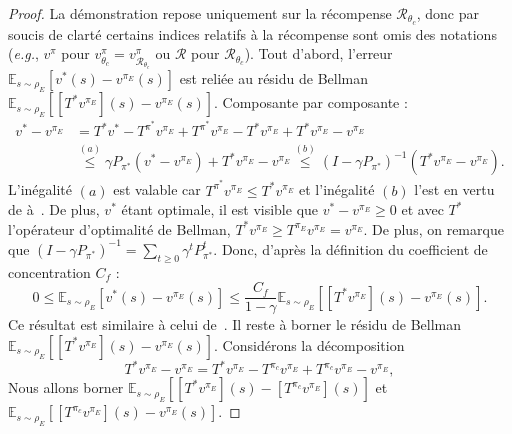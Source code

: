 \documentclass[english,utf8]{./hermes-journal}
\newcommand{\R}{\mathcal{R}}
\newcommand{\E}{\mathbb{E}}
\begin{document}
\begin{proof}
  La démonstration repose uniquement sur la récompense $\R_{\theta_c}$, donc par soucis de clarté certains indices relatifs à la récompense sont omis des notations  
  (\textit{e.g.}, $v^\pi$ pour
  $v^\pi_{\theta_c}=v^\pi_{\R_{\theta_c}}$ ou $\R$ pour $\R_{\theta_c}$). Tout d'abord, l'erreur $\E_{s\sim\rho_E}[v^*(s)-v^{\pi_E}(s)]$ est reliée au résidu de Bellman $\E_{s\sim\rho_E}[[T^*v^{\pi_E}](s)-v^{\pi_E}(s)]$.
  Composante par composante :
  \begin{align}
    v^* - v^{\pi_E} &= T^* v^*  - T^{\pi^*}v^{\pi_E} +
    T^{\pi^*}v^{\pi_E} - T^* v^{\pi_E} + T^* v^{\pi_E} - v^{\pi_E}
    \\
    &\stackrel{(a)}{\leq} \gamma P_{\pi^*}(v^*-v^{\pi_E}) + T^*
    v^{\pi_E} - v^{\pi_E}
    \stackrel{(b)}{\leq} (I-\gamma
    P_{\pi^*})^{-1} (T^* v^{\pi_E} - v^{\pi_E}).
  \end{align}
  L'inégalité $(a)$ est valable car $T^{\pi^*} v^{\pi_E}\leq T^*
  v^{\pi_E}$ et l'inégalité $(b)$ l'est en vertu de à~\cite[Lemme~4.2]{Munos:2007}. De plus, $v^*$ étant optimale, il est visible que  $v^*-v^{\pi_E}\geq 0$ et avec $T^*$ l'opérateur d'optimalité de Bellman, $T^* v^{\pi_E}\geq
  T^{\pi_E}v^{\pi_E}=v^{\pi_E}$. De plus, on remarque que 
  $(I-\gamma P_{\pi^*})^{-1} = \sum_{t\geq 0}\gamma^t P_{\pi^*}^t$.
  Donc, d'après la définition du coefficient de concentration 
  $C_f$ :
  \begin{equation}
    0\leq\E_{s\sim\rho_E}[v^*(s)-v^{\pi_E}(s)] \leq \frac{C_f}{1-\gamma}
    \E_{s\sim\rho_E}\left[[T^*v^{\pi_E}](s) - v^{\pi_E}(s)\right].
    \label{eq:proof:residual}
  \end{equation}
  Ce résultat est similaire à celui de~\cite[Theoreme~4.2]{Munos:2007}. Il reste à borner le résidu de Bellman $\E_{s\sim\rho_E}[[T^*v^{\pi_E}](s) -
  v^{\pi_E}(s)]$. Considérons la décomposition
  \begin{equation}
    T^* v^{\pi_E} - v^{\pi_E} = T^* v^{\pi_E} - T^{\pi_c}v^{\pi_E}
    + T^{\pi_c}v^{\pi_E}- v^{\pi_E},
    \label{eq:proof:decomposition}
  \end{equation}
  Nous allons borner  $\E_{s\sim\rho_E}[[T^* v^{\pi_E}](s) - [T^{\pi_c}v^{\pi_E}](s)]$
  et $\E_{s\sim\rho_E}[[T^{\pi_c}v^{\pi_E}](s) - v^{\pi_E}(s)]$.


\end{proof}
\end{document}

